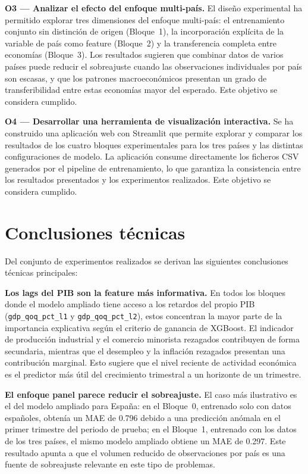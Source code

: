 \textbf{O3 — Analizar el efecto del enfoque multi-país.} El diseño experimental ha
permitido explorar tres dimensiones del enfoque multi-país: el entrenamiento conjunto sin
distinción de origen (Bloque~1), la incorporación explícita de la variable de país como
feature (Bloque~2) y la transferencia completa entre economías (Bloque~3). Los resultados
sugieren que combinar datos de varios países puede reducir el sobreajuste cuando las
observaciones individuales por país son escasas, y que los patrones macroeconómicos
presentan un grado de transferibilidad entre estas economías mayor del esperado. Este
objetivo se considera cumplido.

\textbf{O4 — Desarrollar una herramienta de visualización interactiva.} Se ha construido
una aplicación web con Streamlit que permite explorar y comparar los resultados de los
cuatro bloques experimentales para los tres países y las distintas configuraciones de
modelo. La aplicación consume directamente los ficheros CSV generados por el pipeline de
entrenamiento, lo que garantiza la consistencia entre los resultados presentados y los
experimentos realizados. Este objetivo se considera cumplido.

\section{Conclusiones técnicas}

Del conjunto de experimentos realizados se derivan las siguientes conclusiones técnicas
principales:

\textbf{Los lags del PIB son la feature más informativa.} En todos los bloques donde
el modelo ampliado tiene acceso a los retardos del propio PIB
(\texttt{gdp\_qoq\_pct\_l1} y \texttt{gdp\_qoq\_pct\_l2}), estos concentran la mayor
parte de la importancia explicativa según el criterio de ganancia de XGBoost. El
indicador de producción industrial y el comercio minorista rezagados contribuyen de forma
secundaria, mientras que el desempleo y la inflación rezagados presentan una contribución
marginal. Esto sugiere que el nivel reciente de actividad económica es el predictor más
útil del crecimiento trimestral a un horizonte de un trimestre.

\textbf{El enfoque panel parece reducir el sobreajuste.} El caso más ilustrativo es el
del modelo ampliado para España: en el Bloque~0, entrenado solo con datos españoles,
obtenía un MAE de 0.796 debido a una predicción anómala en el primer trimestre del
periodo de prueba; en el Bloque~1, entrenado con los datos de los tres países, el mismo
modelo ampliado obtiene un MAE de 0.297. Este resultado apunta a que el volumen reducido
de observaciones por país es una fuente de sobreajuste relevante en este tipo de
problemas.

